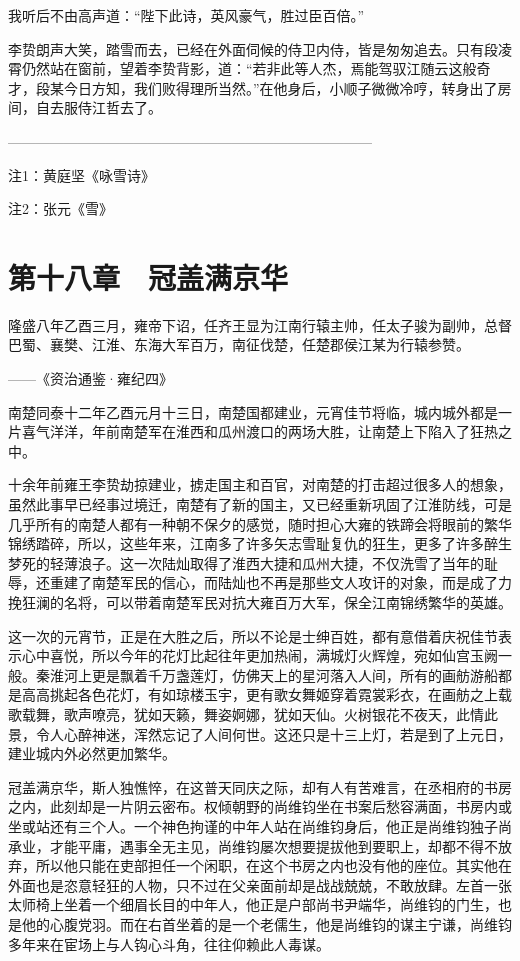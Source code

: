 我听后不由高声道：“陛下此诗，英风豪气，胜过臣百倍。”

李贽朗声大笑，踏雪而去，已经在外面伺候的侍卫内侍，皆是匆匆追去。只有段凌霄仍然站在窗前，望着李贽背影，道：“若非此等人杰，焉能驾驭江随云这般奇才，段某今日方知，我们败得理所当然。”在他身后，小顺子微微冷哼，转身出了房间，自去服侍江哲去了。

——————————————————————————

注1：黄庭坚《咏雪诗》

注2：张元《雪》

\chapter{第十八章　冠盖满京华}

隆盛八年乙酉三月，雍帝下诏，任齐王显为江南行辕主帅，任太子骏为副帅，总督巴蜀、襄樊、江淮、东海大军百万，南征伐楚，任楚郡侯江某为行辕参赞。

——《资治通鉴·雍纪四》

南楚同泰十二年乙酉元月十三日，南楚国都建业，元宵佳节将临，城内城外都是一片喜气洋洋，年前南楚军在淮西和瓜州渡口的两场大胜，让南楚上下陷入了狂热之中。

十余年前雍王李贽劫掠建业，掳走国主和百官，对南楚的打击超过很多人的想象，虽然此事早已经事过境迁，南楚有了新的国主，又已经重新巩固了江淮防线，可是几乎所有的南楚人都有一种朝不保夕的感觉，随时担心大雍的铁蹄会将眼前的繁华锦绣踏碎，所以，这些年来，江南多了许多矢志雪耻复仇的狂生，更多了许多醉生梦死的轻薄浪子。这一次陆灿取得了淮西大捷和瓜州大捷，不仅洗雪了当年的耻辱，还重建了南楚军民的信心，而陆灿也不再是那些文人攻讦的对象，而是成了力挽狂澜的名将，可以带着南楚军民对抗大雍百万大军，保全江南锦绣繁华的英雄。

这一次的元宵节，正是在大胜之后，所以不论是士绅百姓，都有意借着庆祝佳节表示心中喜悦，所以今年的花灯比起往年更加热闹，满城灯火辉煌，宛如仙宫玉阙一般。秦淮河上更是飘着千万盏莲灯，仿佛天上的星河落入人间，所有的画舫游船都是高高挑起各色花灯，有如琼楼玉宇，更有歌女舞姬穿着霓裳彩衣，在画舫之上载歌载舞，歌声嘹亮，犹如天籁，舞姿婀娜，犹如天仙。火树银花不夜天，此情此景，令人心醉神迷，浑然忘记了人间何世。这还只是十三上灯，若是到了上元日，建业城内外必然更加繁华。

冠盖满京华，斯人独憔悴，在这普天同庆之际，却有人有苦难言，在丞相府的书房之内，此刻却是一片阴云密布。权倾朝野的尚维钧坐在书案后愁容满面，书房内或坐或站还有三个人。一个神色拘谨的中年人站在尚维钧身后，他正是尚维钧独子尚承业，才能平庸，遇事全无主见，尚维钧屡次想要提拔他到要职上，却都不得不放弃，所以他只能在吏部担任一个闲职，在这个书房之内也没有他的座位。其实他在外面也是恣意轻狂的人物，只不过在父亲面前却是战战兢兢，不敢放肆。左首一张太师椅上坐着一个细眉长目的中年人，他正是户部尚书尹端华，尚维钧的门生，也是他的心腹党羽。而在右首坐着的是一个老儒生，他是尚维钧的谋主宁谦，尚维钧多年来在宦场上与人钩心斗角，往往仰赖此人毒谋。

